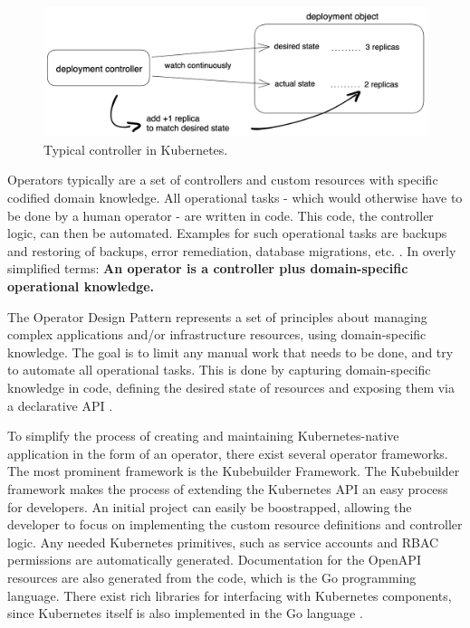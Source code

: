 \begin{figure}[h]
	\centering
	\includegraphics[width=1.00\linewidth]{assets/typical-controller.png}
	\caption{Typical controller in Kubernetes.
	}
	\label{fig:typicalControllerKubernetes}	
\end{figure}

Operators typically are a set of controllers and custom resources
with specific codified domain knowledge.
All operational tasks -
which would otherwise have to be done by a human operator -
are written in code.
This code, the controller logic, can then be automated.
Examples for such operational tasks are
backups and restoring of backups, error remediation, database migrations, etc.
\autocite{operatorWhitepaperV1}.
In overly simplified terms:
\textbf{An operator is a controller plus domain-specific operational knowledge.}
\autocite{operatorWhitepaperV1}


The Operator Design Pattern represents a set of principles about
managing complex applications and/or infrastructure resources,
using domain-specific knowledge.
The goal is to limit any manual work that needs to be done,
and try to automate all operational tasks.
This is done by capturing domain-specific knowledge in code,
defining the desired state of resources and exposing them
via a declarative API
\autocite{operatorWhitepaperV1}.

To simplify the process of creating and maintaining Kubernetes-native application
in the form of an operator,
there exist several operator frameworks.
The most prominent framework is the Kubebuilder Framework.
The Kubebuilder framework makes the process of extending the Kubernetes API
an easy process for developers.
An initial project can easily be boostrapped, allowing the developer to focus
on implementing the custom resource definitions and controller logic.
Any needed Kubernetes primitives, such as service accounts and RBAC permissions
are automatically generated.
Documentation for the OpenAPI resources are also generated from the code,
which is the Go programming language.
There exist rich libraries for interfacing with Kubernetes components,
since Kubernetes itself is also implemented in the Go language
\autocite{kubebuilderBookWebsite}.

